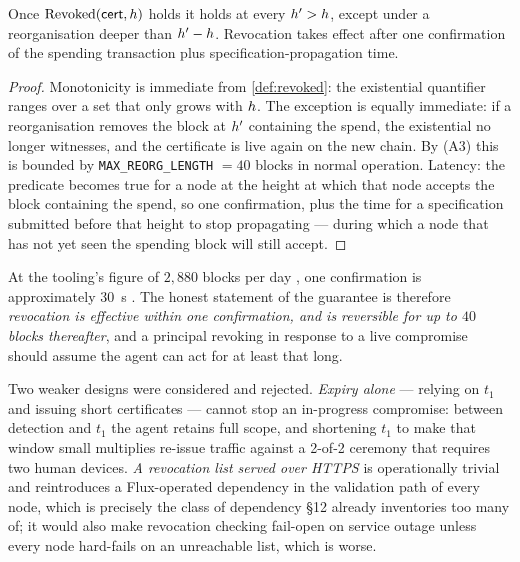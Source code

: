 \begin{property}
\label{prop:monotone}
Once $\mathrm{Revoked}(\mathsf{cert},h)$ holds it holds at every $h' > h$, except under a
reorganisation deeper than $h' - h$. Revocation takes effect after one confirmation of the
spending transaction plus specification-propagation time.
\end{property}

\begin{proof}
Monotonicity is immediate from \cref{def:revoked}: the existential quantifier ranges over a set that
only grows with $h$. The exception is equally immediate: if a reorganisation removes the block at
$h'$ containing the spend, the existential no longer witnesses, and the certificate is live again
on the new chain. By (A3) this is bounded by \texttt{MAX\_REORG\_LENGTH} $=40$ blocks in normal
operation. Latency: the predicate becomes true for a node at the height at which that node accepts
the block containing the spend, so one confirmation, plus the time for a specification submitted
before that height to stop propagating --- during which a node that has not yet seen the spending
block will still accept. \qedhere
\end{proof}

At the tooling's figure of $2{,}880$ blocks per day
, one confirmation is
approximately \SI{30}{\second} \srcinferred. The honest statement of the guarantee is therefore
\emph{revocation is effective within one confirmation, and is reversible for up to $40$ blocks
thereafter}, and a principal revoking in response to a live compromise should assume the agent can
act for at least that long.

Two weaker designs were considered and rejected. \emph{Expiry alone} --- relying on $t_1$ and issuing
short certificates --- cannot stop an in-progress compromise: between detection and $t_1$ the agent
retains full scope, and shortening $t_1$ to make that window small multiplies re-issue traffic
against a 2-of-2 ceremony that requires two human devices. \emph{A revocation list served over
HTTPS} is operationally trivial and reintroduces a Flux-operated dependency in the validation path of
every node, which is precisely the class of dependency \S12 already inventories too many of; it would
also make revocation checking fail-open on service outage unless every node hard-fails on an
unreachable list, which is worse.

